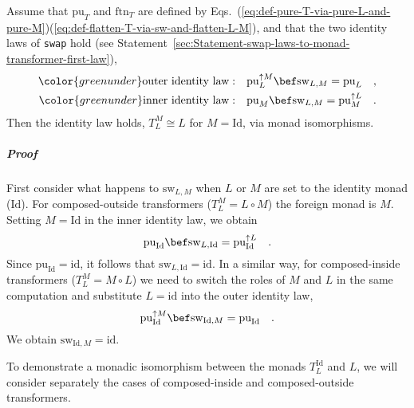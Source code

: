 Assume that $\text{pu}_{T}$ and $\text{ftn}_{T}$ are defined by
Eqs.~(\ref{eq:def-pure-T-via-pure-L-and-pure-M})\textendash (\ref{eq:def-flatten-T-via-sw-and-flatten-L-M}),
and that the two identity laws of \lstinline!swap! hold (see Statement~\ref{sec:Statement-swap-laws-to-monad-transformer-first-law}),
\begin{align*}
{\color{greenunder}\text{outer identity law}:}\quad & \text{pu}_{L}^{\uparrow M}\bef\text{sw}_{L,M}=\text{pu}_{L}\quad,\\
{\color{greenunder}\text{inner identity law}:}\quad & \text{pu}_{M}\bef\text{sw}_{L,M}=\text{pu}_{M}^{\uparrow L}\quad.
\end{align*}
Then the identity law holds, $T_{L}^{M}\cong L$ for $M=\text{Id}$,
via monad isomorphisms. 

\subparagraph{Proof}

First consider what happens to $\text{sw}_{L,M}$ when $L$ or $M$
are set to the identity monad ($\text{Id}$). For composed-outside
transformers ($T_{L}^{M}=L\circ M$) the foreign monad is $M$. Setting
$M=\text{Id}$ in the inner identity law, we obtain 
\[
\text{pu}_{\text{Id}}\bef\text{sw}_{L,\text{Id}}=\text{pu}_{\text{Id}}^{\uparrow L}\quad.
\]
Since $\text{pu}_{\text{Id}}=\text{id}$, it follows that $\text{sw}_{L,\text{Id}}=\text{id}$.
In a similar way, for composed-inside transformers ($T_{L}^{M}=M\circ L$)
we need to switch the roles of $M$ and $L$ in the same computation
and substitute $L=\text{id}$ into the outer identity law,
\[
\text{pu}_{\text{Id}}^{\uparrow M}\bef\text{sw}_{\text{Id},M}=\text{pu}_{\text{Id}}\quad.
\]
We obtain $\text{sw}_{\text{Id},M}=\text{id}$.

\begin{comment}
Note that $\text{sw}_{L,\text{Id}}:L^{A}\rightarrow L^{A}$ is a natural
transformation for a monad $L$, so one may heuristically expect $\text{sw}_{L,\text{Id}}$
to be equal to the identity map (the only natural transformation $L^{A}\rightarrow L^{A}$
that exists for all monads $L$). Similarly, one may expect that $\text{sw}_{\text{Id},M}:M^{A}\rightarrow M^{A}=\text{id}$
since it is a natural transformation. But these are only heuristic
expectations, while we have just shown that the properties $\text{sw}_{L,\text{Id}}=\text{id}$
and $\text{sw}_{\text{Id},M}=\text{id}$ follow from the previously
established laws of \lstinline!swap! without any new assumptions.
These properties will be needed in the proofs below. 
\end{comment}
To demonstrate a monadic isomorphism between the monads $T_{L}^{\text{Id}}$
and $L$, we will consider separately the cases of composed-inside
and composed-outside transformers.

